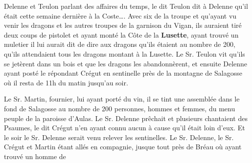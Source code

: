 Delenne et Teulon parlant des affaires du temps, le dit Teulon dit à Delenne qu’il était cette semaine dernière à la Coste…. Avec six de la troupe et qu’ayant vu venir les dragons et les autres troupes de la garnison du Vigan, ils auraient tiré deux coups de pistolet et ayant monté la Côte de la \textbf{Lusette}, ayant trouvé un muletier il lui aurait dit de dire aux dragons qu’ils étaient au nombre de 200, qu’ils attendaient tous les dragons montant à la Lusette. Le Sr. Teulon vit qu’ils se jetèrent dans un bois et que les dragons les abandonnèrent, et ensuite Delenne ayant posté le répondant Crégut en sentinelle près de la montagne de Salagosse où il resta de 11h du matin jusqu’au soir.

Le Sr. Martin, fournier, lui ayant porté du vin, il se tint une assemblée dans le fond de Salagosse au nombre de 200 personnes, hommes et femmes, du menu peuple de la paroisse d’Aulas. Le Sr. Delenne prêchait et plusieurs chantaient des Psaumes, le dit Crégut n’en ayant connu aucun à cause qu’il était loin d’eux.
Et le soir le Sr. Delenne serait venu relever les sentinelles. Le Sr. Delenne, le Sr. Crégut et Martin étant allés en compagnie, jusque tout près de Bréau où ayant trouvé un homme de


